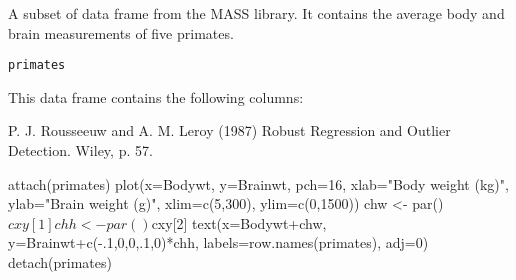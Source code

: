 \begin{Description}\relax
A subset of  data frame from the MASS library.
It contains the average body and brain measurements of five
primates.
\end{Description}
\begin{Usage}
\begin{verbatim}primates\end{verbatim}
\end{Usage}
\begin{Format}\relax
This data frame contains the following columns:
\end{Format}
\begin{Source}\relax
P. J. Rousseeuw  and A. M. Leroy (1987) Robust Regression and
Outlier Detection. Wiley, p. 57.
\end{Source}
\begin{Examples}
\begin{ExampleCode}
attach(primates)
plot(x=Bodywt, y=Brainwt, pch=16,
       xlab="Body weight (kg)", ylab="Brain weight (g)",
       xlim=c(5,300), ylim=c(0,1500))
chw <- par()$cxy[1]
chh <- par()$cxy[2]
text(x=Bodywt+chw, y=Brainwt+c(-.1,0,0,.1,0)*chh,
       labels=row.names(primates), adj=0)
detach(primates)
\end{ExampleCode}
\end{Examples}

